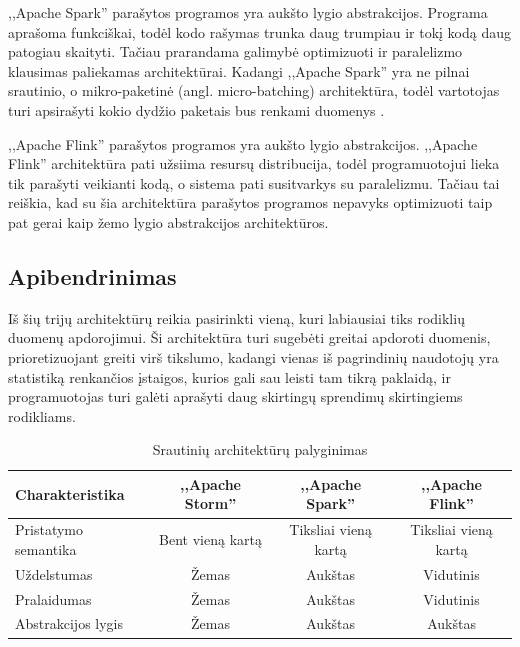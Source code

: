 \documentclass{VUMIFPSkursinis}
\begin{document}
,,Apache Spark'' parašytos programos yra aukšto lygio abstrakcijos. 
Programa aprašoma funkciškai, todėl kodo rašymas trunka daug trumpiau ir tokį kodą daug patogiau skaityti. Tačiau prarandama galimybė optimizuoti
ir paralelizmo klausimas paliekamas architektūrai. Kadangi ,,Apache Spark'' yra ne pilnai srautinio, o mikro-paketinė (angl. micro-batching) 
architektūra, todėl vartotojas turi apsirašyti kokio dydžio paketais bus renkami duomenys \cite{shoro2015big}.

,,Apache Flink'' parašytos programos yra aukšto lygio abstrakcijos. ,,Apache Flink'' 
architektūra pati užsiima resursų distribucija, todėl programuotojui lieka tik parašyti veikianti kodą, o sistema pati susitvarkys su paralelizmu\cite{flinkdoc}. Tačiau 
tai reiškia, kad su šia architektūra parašytos programos nepavyks optimizuoti taip pat gerai kaip žemo lygio abstrakcijos architektūros.

\subsection{Apibendrinimas}
Iš šių trijų architektūrų reikia pasirinkti vieną, kuri labiausiai tiks rodiklių duomenų apdorojimui. Ši architektūra turi sugebėti greitai apdoroti duomenis,
prioretizuojant greiti virš tikslumo, kadangi vienas iš pagrindinių naudotojų yra statistiką renkančios įstaigos, kurios gali sau leisti tam tikrą paklaidą,
ir programuotojas turi galėti aprašyti daug skirtingų sprendimų skirtingiems rodikliams.\par

\begin{center}
    \begin{table}[!htbp]
        \caption{Srautinių architektūrų palyginimas}
        \label{table:comparer}
        \begin{tabular}{ | l | c | c | c | } 
            \hline
            Charakteristika & ,,Apache Storm'' & ,,Apache Spark'' & ,,Apache Flink'' \\* \hline
            Pristatymo semantika & Bent vieną kartą & Tiksliai vieną kartą & Tiksliai vieną kartą \\* \hline
            Uždelstumas & Žemas & Aukštas & Vidutinis \\* \hline
            Pralaidumas & Žemas & Aukštas & Vidutinis \\* \hline
            Abstrakcijos lygis & Žemas & Aukštas & Aukštas \\* \hline
        \end{tabular}
    \end{table}
\end{center}\par
\end{document}
